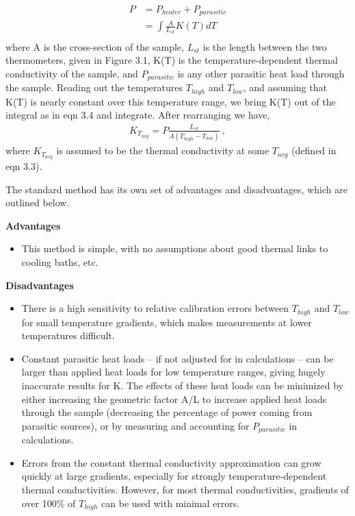 \documentclass{report}
\begin{document}
\begin{equation}
    \begin{aligned}
P & = P_{heater} + P_{parasitic}\\
  & = \int \frac{A}{L_{st}} K(T)dT\\
    \end{aligned}
\end{equation}
where A is the cross-section of the sample, $L_{st}$ is the length between the two thermometers, given in Figure 3.1, K(T) is the temperature-dependent thermal conductivity of the sample, and $P_{parasitic}$ is any other parasitic heat load through the sample. Reading out the temperatures $T_{high}$ and $T_{low}$, and assuming that K(T) is nearly constant over this temperature range, we bring K(T) out of the integral as in eqn 3.4 and integrate. After rearranging we have,
\begin{eqnarray}
K_{T_{avg}} = P\frac{L_{st}}{A(T_{high} - T_{low})} \ ,
\end{eqnarray}
where $K_{T_{avg}}$ is assumed to be the thermal conductivity at some $T_{avg}$ (defined in eqn 3.3).

The standard method has its own set of advantages and disadvantages, which are outlined below.

\bigskip

\textbf{Advantages}
\begin{itemize}
\item This method is simple, with no assumptions about good thermal links to cooling baths, etc.
\end{itemize}

\textbf{Disadvantages}
\begin{itemize}
\item There is a high sensitivity to relative calibration errors between $T_{high}$ and $T_{low}$ for small temperature gradients, which makes measurements at lower temperatures difficult.
\item Constant parasitic heat loads -- if not adjusted for in calculations -- can be larger than applied heat loads for low temperature ranges, giving hugely inaccurate results for K. The effects of these heat loads can be minimized by either increasing the geometric factor A/L to increase applied heat loads through the sample (decreasing the percentage of power coming from parasitic sources), or by measuring and accounting for $P_{parasitic}$ in calculations.
\item Errors from the constant thermal conductivity approximation can grow quickly at large gradients, especially for strongly temperature-dependent thermal conductivities. However, for most thermal conductivities, gradients of over 100\% of $T_{high}$ can be used with minimal errors\footnotemark.
\end{itemize}
\end{document}
